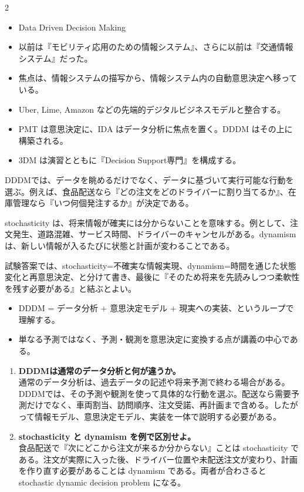 \clearpage
{}
\begin{multicols}{2}\footnotesize\raggedcolumns
{}
\begin{itemize}
\item Data Driven Decision Making
\item 以前は『モビリティ応用のための情報システム』、さらに以前は『交通情報システム』だった。
\item 焦点は、情報システムの描写から、情報システム内の自動意思決定へ移っている。
\item Uber, Lime, Amazon などの先端的デジタルビジネスモデルと整合する。
\item PMT は意思決定に、IDA はデータ分析に焦点を置く。DDDM はその上に構築される。
\item 3DM は演習とともに『Decision Support専門』を構成する。
\end{itemize}
DDDMでは、データを眺めるだけでなく、データに基づいて実行可能な行動を選ぶ。例えば、食品配送なら『どの注文をどのドライバーに割り当てるか』、在庫管理なら『いつ何個発注するか』が決定である。\par

stochasticity は、将来情報が確実には分からないことを意味する。例として、注文発生、道路混雑、サービス時間、ドライバーのキャンセルがある。dynamism は、新しい情報が入るたびに状態と計画が変わることである。\par

試験答案では、stochasticity=不確実な情報実現、dynamism=時間を通じた状態変化と再意思決定、と分けて書き、最後に『そのため将来を先読みしつつ柔軟性を残す必要がある』と結ぶとよい。\par
{}
\begin{itemize}
\item DDDM = データ分析 + 意思決定モデル + 現実への実装、というループで理解する。
\item 単なる予測ではなく、予測・観測を意思決定に変換する点が講義の中心である。
\end{itemize}
\begin{enumerate}
\item \textbf{DDDMは通常のデータ分析と何が違うか。}\\通常のデータ分析は、過去データの記述や将来予測で終わる場合がある。DDDMでは、その予測や観測を使って具体的な行動を選ぶ。配送なら需要予測だけでなく、車両割当、訪問順序、注文受諾、再計画まで含める。したがって情報モデル、意思決定モデル、実装を一体で説明する必要がある。
\item \textbf{stochasticity と dynamism を例で区別せよ。}\\食品配送で『次にどこから注文が来るか分からない』ことは stochasticity である。注文が実際に入った後、ドライバー位置や未配送注文が変わり、計画を作り直す必要があることは dynamism である。両者が合わさると stochastic dynamic decision problem になる。
\end{enumerate}
\end{multicols}

